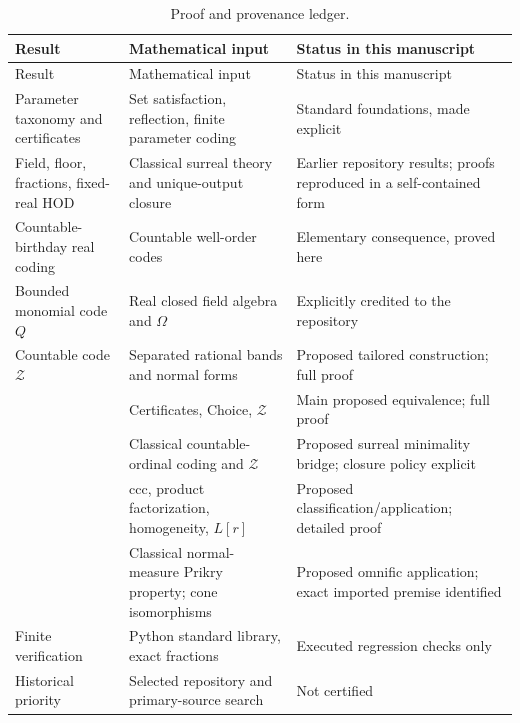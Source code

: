 \documentclass[11pt,a4paper]{article}
\numberwithin{equation}{section}
\theoremstyle{definition}
\theoremstyle{remark}
\newcommand{\Zc}{\mathcal Z}
\begin{document}
\begin{longtable}{@{}P{0.22\textwidth}P{0.43\textwidth}P{0.27\textwidth}@{}}
\caption{Proof and provenance ledger.}\label{dsn:ca:tab:ledger}\\
\toprule
Result & Mathematical input & Status in this manuscript\\
\midrule
\endfirsthead
\toprule Result & Mathematical input & Status in this manuscript\\\midrule
\endhead
Parameter taxonomy and certificates & Set satisfaction, reflection, finite parameter coding & Standard foundations, made explicit\\
Field, floor, fractions, fixed-real HOD & Classical surreal theory and unique-output closure & Earlier repository results; proofs reproduced in a self-contained form\\
Countable-birthday real coding & Countable well-order codes & Elementary consequence, proved here\\
Bounded monomial code $Q$ & Real closed field algebra and $\Omega$ & Explicitly credited to the repository\\
Countable code $\Zc$ & Separated rational bands and normal forms & Proposed tailored construction; full proof\\
 & Certificates, Choice, $\Zc$ & Main proposed equivalence; full proof\\
 & Classical countable-ordinal coding and $\Zc$ & Proposed surreal minimality bridge; closure policy explicit\\
 & ccc, product factorization, homogeneity, $L[r]$ & Proposed classification/application; detailed proof\\
 & Classical normal-measure Prikry property; cone isomorphisms & Proposed omnific application; exact imported premise identified\\
Finite verification & Python standard library, exact fractions & Executed regression checks only\\
Historical priority & Selected repository and primary-source search & Not certified\\
\bottomrule
\end{longtable}
\end{document}
